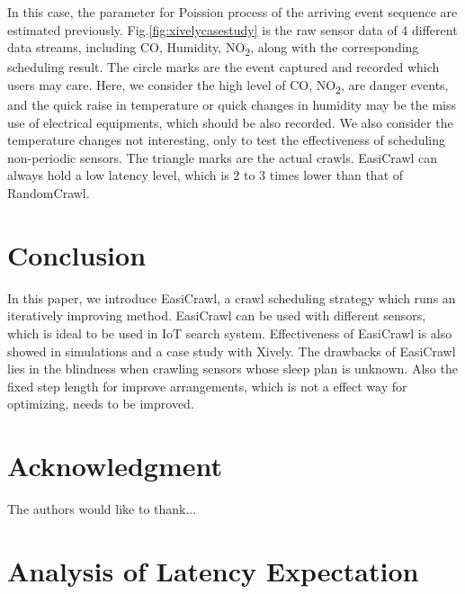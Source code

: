 \documentclass[conference]{IEEEtran}
\begin{document}
In this case, the parameter for Poission process of the arriving event sequence are estimated previously.
Fig.\ref{fig:xivelycasestudy} is the raw sensor data of 4 different data streams, including CO, Humidity, NO\textsubscript{2}, along with the corresponding scheduling result. The circle marks are the event captured and recorded which users may care. Here, we consider the high level of CO, NO\textsubscript{2}, are danger events, and the quick raise in temperature or quick changes in humidity may be the miss use of electrical equipments, which should be also recorded. We also consider the temperature changes not interesting, only to test the effectiveness of scheduling non-periodic sensors.
The triangle marks are the actual crawls. EasiCrawl can always hold a low latency level, which is 2 to 3 times lower than that of RandomCrawl.

\section{Conclusion} \label{conclusion}

In this paper, we introduce EasiCrawl, a crawl scheduling strategy which runs an iteratively improving method. EasiCrawl can be used with different sensors, which is ideal to be used in IoT search system. Effectiveness of EasiCrawl is also showed in simulations and a case study with Xively. 
The drawbacks of EasiCrawl lies in the blindness when crawling sensors whose sleep plan is unknown. 
Also the fixed step length for improve arrangements, which is not a effect way for optimizing, needs to be improved.

\section*{Acknowledgment}


The authors would like to thank...


\ifCLASSOPTIONcaptionsoff
  \newpage
\fi





\appendices
\section{Analysis of Latency Expectation}
\end{document}
